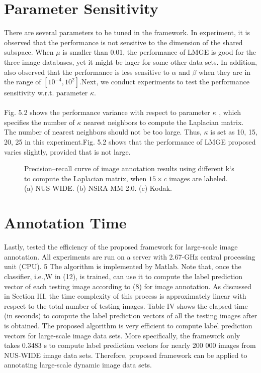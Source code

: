 \documentclass[a4paper,11pt]{report}
\begin{document}
\section{Parameter Sensitivity}
There are several parameters to be tuned in the framework.
In  experiment, it is observed that the performance is not sensitive
to the dimension of the shared subspace. When $\mu$ is smaller than 0.01, the performance of LMGE is good for the three image
databases, yet it might be lager for some other data sets. In addition,
also observed that the performance is less sensitive to $\alpha$ and $\beta$
when they are in the range of $[10^{-4},10^2]$.Next, we conduct
experiments to test the performance sensitivity w.r.t. parameter $\kappa$.
\paragraph{}
Fig. 5.2 shows the performance variance with respect to parameter $\kappa$
, which specifies the number of $\kappa$ nearest neighbors to
compute the Laplacian matrix. The number of nearest neighbors
should not be too large. Thus, $\kappa$ is set as {10, 15, 20, 25}
in this experiment.Fig. 5.2 shows that the performance
of LMGE proposed  varies slightly, provided that
is not large. 
\begin{figure} [ht]
 \centering
\caption{Precision–recall curve of image annotation results using different k`s to compute the Laplacian matrix, when $15\times c$ images are labeled. (a) NUS-WIDE.
(b) NSRA-MM 2.0. (c) Kodak.}
\end{figure}
\section{Annotation Time}

Lastly,  tested the efficiency of the proposed framework
for large-scale image annotation. All experiments are run
on a server with 2.67-GHz central processing unit (CPU). 5
The algorithm is implemented by Matlab. Note that, once the
classifier, i.e.,W in (12), is trained,  can use it to compute
the label prediction vector of each testing image according to
(8) for image annotation. As  discussed in Section III, the
time complexity of this process is approximately linear with
respect to the total number of testing images. Table IV shows
the elapsed time (in seconds) to compute the label prediction
vectors of all the testing images after is obtained. The proposed algorithm is very efficient to compute label prediction
vectors for large-scale image data sets. More specifically, the
framework only takes 0.3483 s to compute label prediction
vectors for nearly 200 000 images from NUS-WIDE image
data sets. Therefore, proposed framework can
be applied to annotating large-scale dynamic image data sets.
\begin{figure} [ht]
 \centering

\end{figure}
\end{document}
